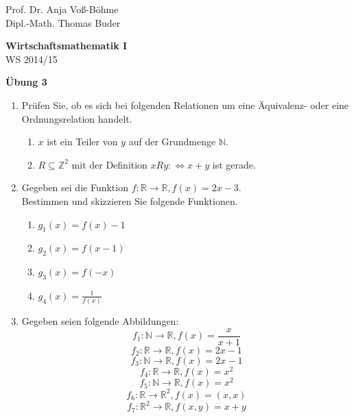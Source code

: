 \documentclass[12pt,a4paper]{scrreprt}
\newcommand{\N}{\mathds{N}}
\newcommand{\Z}{\mathds{Z}}
\newcommand{\R}{\mathds{R}}
\begin{document}
 
\begin{flushleft}
Prof. Dr.  Anja Voß-Böhme \\
Dipl.-Math. Thomas Buder
\end{flushleft}

\begin{center}{\large\bf Wirtschaftsmathematik I} \\ WS 2014/15 \end{center}

\begin{center}{\large\bf Übung 3 } 
\end{center}


\bigskip
\begin{enumerate}
 			
\item Prüfen Sie, ob es sich bei folgenden Relationen um eine Äquivalenz- oder eine Ordnungsrelation handelt.

		\begin{enumerate}
			\item $x$ ist ein Teiler von $y$ auf der Grundmenge $\N$.
			\item $ R\subseteq \Z^2$ mit der Definition $x R y:\Leftrightarrow x+y$ ist gerade.
		\end{enumerate}
		
		
\item Gegeben sei die Funktion $f: \R \to \R, f(x)=2x-3.$ \\
			Bestimmen und skizzieren Sie folgende Funktionen.
 \begin{enumerate}
			\item $g_1(x)=f(x)-1$
			\item $g_2(x)=f(x-1)$
			\item $g_3(x)=f(-x)$
			\item $g_4(x)=\frac{1}{f(x)}$
 \end{enumerate}

 \item Gegeben seien folgende Abbildungen: \\
\[f_1: \N \to \R,   f(x)=\frac{x}{x+1}\]
\[f_2: \R \to \R,   f(x)=2x-1\]
\[f_3: \N \to \R,   f(x)=2x-1\]
\[f_4: \R \to \R,   f(x)=x^2\]
\[f_5: \N \to \R,   f(x)=x^2\]
\[f_6: \R \to \R^2, f(x)=(x,x) \]
\[f_7: \R^2 \to \R, f(x,y) = x+y \] 


\end{enumerate}
\end{document}
